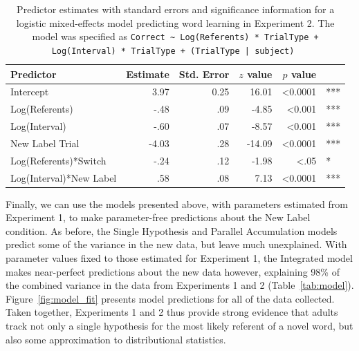 \documentclass{pnastwo}
\begin{document}
\begin{article}
\begin{table}
\begin{center}
\begin{tabular}{lrrrrl}
\hline
Predictor & Estimate & Std. Error & $z$ value & $p$ value & \\
\hline
Intercept & 3.97 & 0.25  & 16.01 &  <0.0001 & ***  \\
Log(Referents)  & -.48 & .09  & -4.85 &  <0.001 & ***   \\
Log(Interval)  & -.60 & .07  & -8.57 &  <0.001 & ***  \\
New Label Trial  & -4.03 & .28  & -14.09 &  <0.0001 & ***   \\
Log(Referents)*Switch  & -.24 & .12  & -1.98 &  <.05 & * \\
Log(Interval)*New Label  & .58 & .08 & 7.13 &  <0.0001 & ***   \\
\hline
\end{tabular}
\end{center}
\caption{\label{tab:exp2_reg}Predictor estimates with standard errors and significance information for a logistic mixed-effects model predicting word learning in Experiment 2. The model was specified as \small{\tt{Correct \textasciitilde \hspace{1pt} Log(Referents) * TrialType + Log(Interval) * TrialType + (TrialType | subject)} }}
\end{table}



Finally, we can use the models presented above, with parameters estimated from Experiment 1, to make parameter-free predictions about the New Label condition. As before, the Single Hypothesis and Parallel Accumulation models predict some of the variance in the new data, but leave much unexplained. With parameter values fixed to those estimated for Experiment 1, the Integrated model makes near-perfect predictions about the new data however, explaining 98\% of the combined variance in the data from Experiments 1 and 2 (Table~\ref{tab:model}). Figure~\ref{fig:model_fit} presents model predictions for all of the data collected. Taken together, Experiments 1 and 2 thus provide strong evidence that adults track not only a single hypothesis for the most likely referent of a novel word, but also some approximation to distributional statistics.


\end{article}
\end{document}

